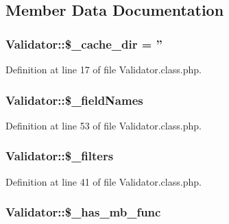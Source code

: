 \subsection{Member Data Documentation}
\hypertarget{classValidator_aaba7f33304aedded2c308120a0925e77}{
\subsubsection[{\$\+\_\+cache\+\_\+dir}]{\setlength{\rightskip}{0pt plus 5cm}Validator\+::\$\+\_\+cache\+\_\+dir = ''}}\label{classValidator_aaba7f33304aedded2c308120a0925e77}


Definition at line 17 of file Validator.\+class.\+php.

\hypertarget{classValidator_a5689ec4c9687c826fc82902fa9b662d8}{
\subsubsection[{\$\+\_\+field\+Names}]{\setlength{\rightskip}{0pt plus 5cm}Validator\+::\$\+\_\+field\+Names}}\label{classValidator_a5689ec4c9687c826fc82902fa9b662d8}


Definition at line 53 of file Validator.\+class.\+php.

\hypertarget{classValidator_ab86eb87cb828002c10d06be613d7b013}{
\subsubsection[{\$\+\_\+filters}]{\setlength{\rightskip}{0pt plus 5cm}Validator\+::\$\+\_\+filters}}\label{classValidator_ab86eb87cb828002c10d06be613d7b013}


Definition at line 41 of file Validator.\+class.\+php.

\hypertarget{classValidator_a8ac5ee1cf7a5ba237ee40c61a5d834c1}{
\subsubsection[{\$\+\_\+has\+\_\+mb\+\_\+func}]{\setlength{\rightskip}{0pt plus 5cm}Validator\+::\$\+\_\+has\+\_\+mb\+\_\+func}}\label{classValidator_a8ac5ee1cf7a5ba237ee40c61a5d834c1}


